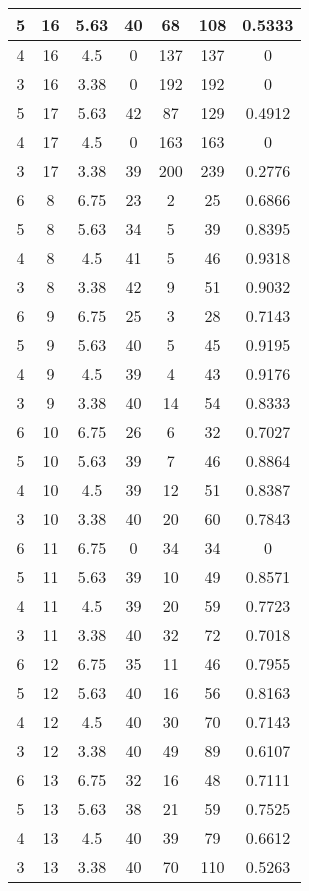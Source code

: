 \documentclass[letterpaper, 12pt]{article}
\begin{document}
\begin{longtable}{|c|c|c|c|c|c|c|}
\hline
5 & 16 & 5.63 & 40 & 68 & 108 & 0.5333 \\
\hline
4 & 16 & 4.5 & 0 & 137 & 137 & 0 \\
\hline
3 & 16 & 3.38 & 0 & 192 & 192 & 0 \\
\hline
5 & 17 & 5.63 & 42 & 87 & 129 & 0.4912 \\
\hline
4 & 17 & 4.5 & 0 & 163 & 163 & 0 \\
\hline
3 & 17 & 3.38 & 39 & 200 & 239 & 0.2776 \\
\hline
6 & 8 & 6.75 & 23 & 2 & 25 & 0.6866 \\
\hline
5 & 8 & 5.63 & 34 & 5 & 39 & 0.8395 \\
\hline
4 & 8 & 4.5 & 41 & 5 & 46 & 0.9318 \\
\hline
3 & 8 & 3.38 & 42 & 9 & 51 & 0.9032 \\
\hline
6 & 9 & 6.75 & 25 & 3 & 28 & 0.7143 \\
\hline
5 & 9 & 5.63 & 40 & 5 & 45 & 0.9195 \\
\hline
4 & 9 & 4.5 & 39 & 4 & 43 & 0.9176 \\
\hline
3 & 9 & 3.38 & 40 & 14 & 54 & 0.8333 \\
\hline
6 & 10 & 6.75 & 26 & 6 & 32 & 0.7027 \\
\hline
5 & 10 & 5.63 & 39 & 7 & 46 & 0.8864 \\
\hline
4 & 10 & 4.5 & 39 & 12 & 51 & 0.8387 \\
\hline
3 & 10 & 3.38 & 40 & 20 & 60 & 0.7843 \\
\hline
6 & 11 & 6.75 & 0 & 34 & 34 & 0 \\
\hline
5 & 11 & 5.63 & 39 & 10 & 49 & 0.8571 \\
\hline
4 & 11 & 4.5 & 39 & 20 & 59 & 0.7723 \\
\hline
3 & 11 & 3.38 & 40 & 32 & 72 & 0.7018 \\
\hline
6 & 12 & 6.75 & 35 & 11 & 46 & 0.7955 \\
\hline
5 & 12 & 5.63 & 40 & 16 & 56 & 0.8163 \\
\hline
4 & 12 & 4.5 & 40 & 30 & 70 & 0.7143 \\
\hline
3 & 12 & 3.38 & 40 & 49 & 89 & 0.6107 \\
\hline
6 & 13 & 6.75 & 32 & 16 & 48 & 0.7111 \\
\hline
5 & 13 & 5.63 & 38 & 21 & 59 & 0.7525 \\
\hline
4 & 13 & 4.5 & 40 & 39 & 79 & 0.6612 \\
\hline
3 & 13 & 3.38 & 40 & 70 & 110 & 0.5263 \\

\end{longtable}
\end{document}

